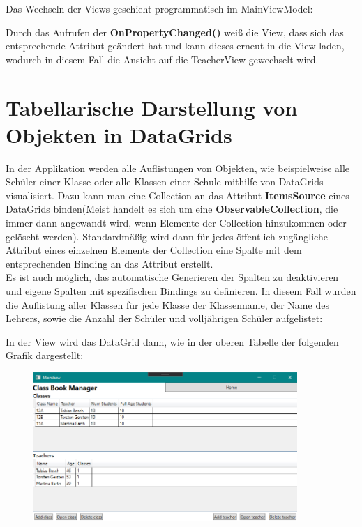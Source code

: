 \documentclass[titlepage=false,12pt]{scrreprt}
\begin{document}
\noindent
Das Wechseln der Views geschieht programmatisch im MainViewModel:



Durch das Aufrufen der \textbf{OnPropertyChanged()} weiß die View, dass sich das entsprechende Attribut
geändert hat und kann dieses erneut in die View laden, wodurch in diesem Fall die Ansicht auf die TeacherView gewechselt wird.

\section{Tabellarische Darstellung von Objekten in DataGrids}
In der Applikation werden alle Auflistungen von Objekten, wie beispielweise alle Schüler einer Klasse oder alle Klassen einer Schule
mithilfe von DataGrids visualisiert. Dazu kann man eine Collection an das Attribut \textbf{ItemsSource} eines DataGrids binden(Meist handelt es
sich um eine \textbf{ObservableCollection}, die immer dann angewandt wird, wenn Elemente der Collection hinzukommen oder gelöscht werden).
Standardmäßig wird dann für jedes öffentlich zugängliche Attribut eines einzelnen Elements der Collection eine Spalte mit dem 
entsprechenden Binding an das Attribut erstellt.\\
Es ist auch möglich, das automatische Generieren der Spalten zu deaktivieren und eigene Spalten mit spezifischen Bindings zu definieren.
In diesem Fall wurden die Auflistung aller Klassen für jede Klasse der Klassenname, der Name des Lehrers, sowie die Anzahl der Schüler und
volljährigen Schüler aufgelistet:



\noindent
In der View wird das DataGrid dann, wie in der oberen Tabelle der folgenden Grafik dargestellt:

\begin{figure}
	\includegraphics[width=10cm]{screenshots/SummarView.png}
\end{figure}
\end{document}
